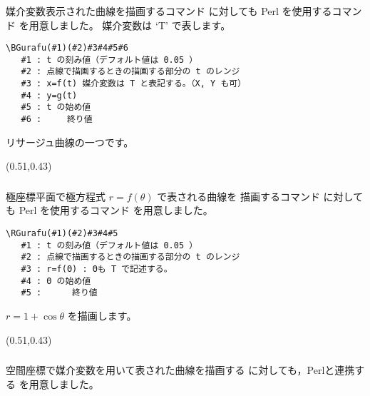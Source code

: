 \subsubsection{}
媒介変数表示された曲線を描画するコマンド  に対しても
\textsf{Perl} を使用するコマンド  を用意しました。
媒介変数は `T' で表します。

\begin{boxnote}
\begin{verbatim}
\BGurafu(#1)(#2)#3#4#5#6
   #1 : t の刻み値（デフォルト値は 0.05 ）
   #2 : 点線で描画するときの描画する部分の t のレンジ
   #3 : x=f(t) 媒介変数は T と表記する。（X, Y も可）
   #4 : y=g(t)
   #5 : t の始め値
   #6 :     終り値
\end{verbatim}
\end{boxnote}

リサージュ曲線の一つです。
\begin{showEx}(0.51,0.43){}
\small
{}
\end{showEx}

\subsubsection{}
極座標平面で極方程式 $r=f(\theta)$ で表される曲線を
描画するコマンド  に対しても
\textsf{Perl} を使用するコマンド  を用意しました。

\begin{boxnote}
\begin{verbatim}
\RGurafu(#1)(#2)#3#4#5
   #1 : t の刻み値（デフォルト値は 0.05 ）
   #2 : 点線で描画するときの描画する部分の t のレンジ
   #3 : r=f(Θ) : Θも T で記述する。
   #4 : Θ の始め値
   #5 :      終り値
\end{verbatim}
\end{boxnote}

$r=1+\cos\theta$ を描画します。

\begin{showEx}(0.51,0.43){}
\small
{}
\end{showEx}

\subsubsection{}
空間座標で媒介変数を用いて表された曲線を描画する
に対しても，\textsf{Perl}と連携する
を用意しました。

